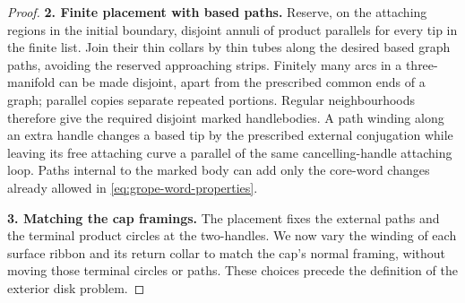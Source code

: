 \begin{proof}
\smallskip\noindent\textbf{2. Finite placement with based paths.}\quad
Reserve, on the attaching regions in the initial boundary, disjoint
annuli of product parallels for every tip in the finite list. Join their
thin collars by thin tubes along the desired based graph paths, avoiding
the reserved approaching strips. Finitely many arcs in a three-manifold
can be made disjoint, apart from the prescribed common ends of a graph;
parallel copies separate repeated portions. Regular neighbourhoods
therefore give the required disjoint marked handlebodies. A path winding
along an extra handle changes a based tip by the prescribed external
conjugation while leaving its free attaching curve a parallel of the
same cancelling-handle attaching loop. Paths internal to the marked
body can add only the core-word changes already allowed in
\eqref{eq:grope-word-properties}.

\smallskip\noindent\textbf{3. Matching the cap framings.}\quad
The placement fixes the external paths and the terminal product circles
at the two-handles. We now vary the winding of each surface ribbon and
its return collar to match the cap's normal framing, without moving
those terminal circles or paths. These choices precede the definition
of the exterior disk problem.


\end{proof}
